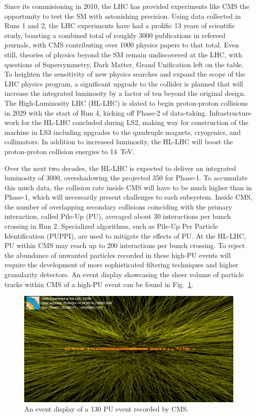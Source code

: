 Since its commisioning in 2010, the LHC has provided experiments like CMS the opportunity to test the SM with astonishing precision. Using data collected in Runs 1 and 2, the LHC experiments have had a prolific 13 years of scientific study, boasting a combined total of roughly 3000 publications in refereed journals, with CMS contributing over 1000 physics papers to that total. Even still, theories of physics beyond the SM remain undiscovered at the LHC, with questions of Supersymmetry, Dark Matter, Grand Unification left on the table. To heighten the sensitivity of new physics searches and expand the scope of the LHC physics program, a significant upgrade to the collider is planned that will increase the integrated luminosity by a factor of ten beyond the original design. The High-Luminosity LHC (HL-LHC) is slated to begin proton-proton collisions in 2029 with the start of Run 4, kicking off Phase-2 of data-taking. Infrastructure work for the HL-LHC concluded during LS2, making way for construction of the machine in LS3 including upgrades to the quadruple magnets, cryogenics, and collimators. In addition to increased luminosity, the HL-LHC will boost the proton-proton collision energies to \SI{14}{TeV}. 

Over the next two decades, the HL-LHC is expected to deliver an integrated luminosity of \SI{3000}{\fbinv}, overshadowing the projected \SI{350}{\fbinv} for Phase-1. To accumulate this much data, the collision rate inside CMS will have to be much higher than in Phase-1, which will necessarily present challenges to each subsystem. Inside CMS, the number of overlapping secondary collisions coinciding with the primary interaction, called Pile-Up (PU), averaged about 30 interactions per bunch crossing in Run 2. Specialized algorithms, such as Pile-Up Per Particle Identification (PUPPI), are used to mitigate the effects of PU. At the HL-LHC, PU within CMS may reach up to 200 interactions per bunch crossing. To reject the abundance of unwanted particles recorded in these high-PU events will require the development of more sophisticated filtering techniques and higher granularity detectors. An event display showcasing the sheer volume of particle tracks within CMS of a high-PU event can be found in Fig.~\ref{fig:highPU}. 

\begin{figure}[H]
    \centering
    \includegraphics[width=1\textwidth]{Images/Phase2Upgrades/highpileup.png}
    \caption{An event display of a 130 PU event recorded by CMS.}
    \label{fig:highPU}
\end{figure}

